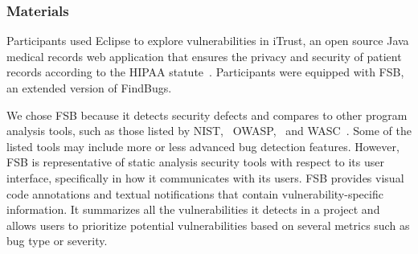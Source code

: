 \documentclass[10pt,journal,compsoc]{IEEEtran}
\begin{document}
\subsubsection{Materials}
Participants used Eclipse to explore vulnerabilities in iTrust, an open source Java medical records web application that ensures the privacy and security of patient records according to the HIPAA statute~\cite{HIPAA}. 
Participants were equipped with FSB, an extended version of FindBugs.

We chose FSB because it detects security defects and compares to other program analysis tools, such as those listed by NIST,~\cite{SecurityAnalyzers} OWASP,~\cite{OWASPSCA} and WASC~\cite{CodeAnalysis}. 
Some of the listed tools may include more or less advanced bug detection features. 
However, FSB is representative of static analysis security tools with respect to its user interface, specifically in how it communicates with its users.
FSB provides visual code annotations and textual notifications that contain vulnerability-specific information.
It summarizes all the vulnerabilities it detects in a project and allows users to prioritize potential vulnerabilities based on several metrics such as bug type or severity.
\end{document}
